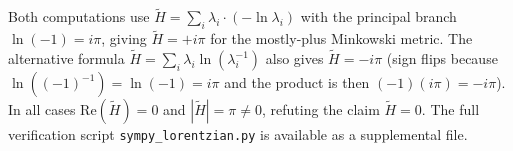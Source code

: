\documentclass[aps,prd,twocolumn,preprintnumbers,superscriptaddress]{revtex4-2}
\newcommand{\iunit}{i}
\begin{document}
\noindent
Both computations use $\tilde{H} = \sum_i\lambda_i\cdot(-\ln\lambda_i)$
with the principal branch $\ln(-1)=\iunit\pi$, giving $\tilde{H}=+\iunit\pi$
for the mostly-plus Minkowski metric.
The alternative formula $\tilde{H} = \sum_i\lambda_i\ln(\lambda_i^{-1})$
also gives $\tilde{H}=-\iunit\pi$ (sign flips because $\ln((-1)^{-1})=\ln(-1)=\iunit\pi$
and the product is then $(-1)(\iunit\pi)=-\iunit\pi$).
In all cases $\mathrm{Re}(\tilde{H})=0$ and $|\tilde{H}|=\pi\neq 0$,
refuting the claim $\tilde{H}=0$.
The full verification script \texttt{sympy\_lorentzian.py} is available
as a supplemental file.
\end{document}
